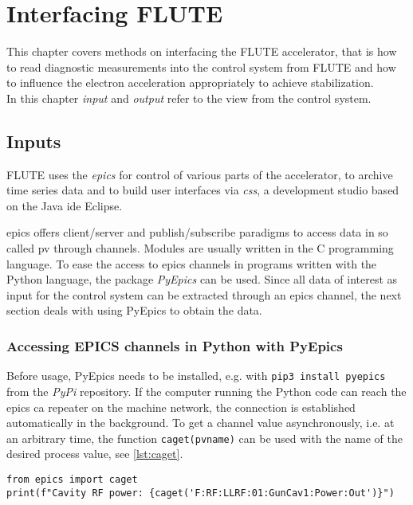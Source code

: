 \chapter{Interfacing FLUTE}
This chapter covers methods on interfacing the FLUTE accelerator, that is how to read diagnostic measurements into the control system from FLUTE and how to influence the electron acceleration appropriately to achieve stabilization.\\
In this chapter \textit{input} and \textit{output} refer to the view from the control system.

\section{Inputs}\label{sec:inputs}
FLUTE uses the \textit{\gls{epics}}\cite{Dalesio1991} for control of various parts of the accelerator, to archive time series data and to build user interfaces via \textit{\gls{css}}\cite{CSS2021}, a development studio based on the Java \gls{ide} Eclipse. \cite{Mexner2018}

\Gls{epics} offers client/server and publish/subscribe paradigms to access data in so called \gls{pv} through channels. Modules are usually written in the C programming language. To ease the access to \gls{epics} channels in programs written with the Python language, the package \textit{PyEpics}\cite{Newville2019} can be used. Since all data of interest as input for the control system can be extracted through an \gls{epics} channel, the next section deals with using PyEpics to obtain the data.

\subsection{Accessing EPICS channels in Python with PyEpics}
Before usage, PyEpics needs to be installed, e.g. with \texttt{pip3 install pyepics} from the \textit{PyPi} repository. If the computer running the Python code can reach the \gls{epics} \gls{ca} repeater on the machine network, the connection is established automatically in the background. To get a channel value asynchronously, i.e. at an arbitrary time, the function \texttt{caget(pvname)} can be used with the name of the desired process value, see \autoref{lst:caget}.

\begin{lstlisting}[style=python,caption = Using \texttt{caget()} to get the value of an EPICS process value, label = lst:caget]
from epics import caget
print(f"Cavity RF power: {caget('F:RF:LLRF:01:GunCav1:Power:Out')}")
\end{lstlisting}

